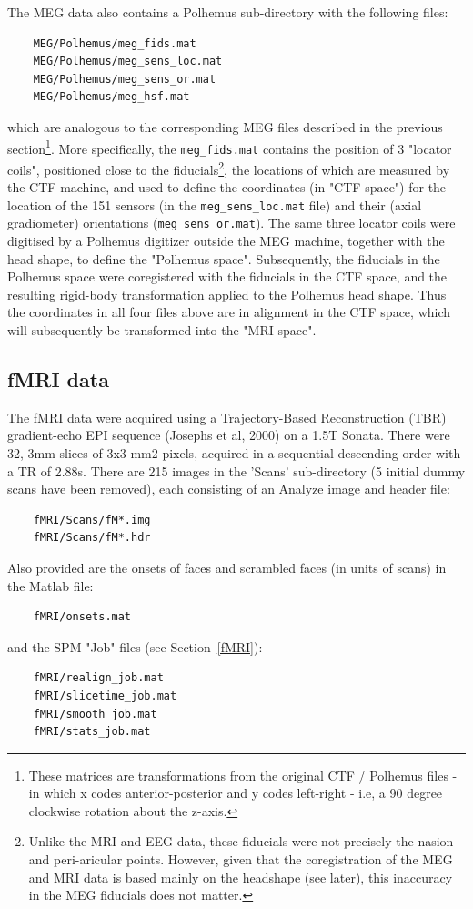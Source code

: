 The MEG data also contains a Polhemus sub-directory with the following files:
\begin{verbatim}
	MEG/Polhemus/meg_fids.mat
	MEG/Polhemus/meg_sens_loc.mat
	MEG/Polhemus/meg_sens_or.mat
	MEG/Polhemus/meg_hsf.mat
\end{verbatim}
which are analogous to the corresponding MEG files described in the previous section\footnote{These matrices are transformations from the original CTF / Polhemus files - in which x codes anterior-posterior and y codes left-right - i.e, a 90 degree clockwise rotation about the z-axis.}. More specifically, the \verb!meg_fids.mat! contains the position of 3 "locator coils", positioned close to the fiducials\footnote{Unlike the MRI and EEG data, these fiducials were not precisely the nasion and peri-aricular points. However, given that the coregistration of the MEG and MRI data is based mainly on the headshape (see later), this inaccuracy in the MEG fiducials does not matter.}, the locations of which are measured by the CTF machine, and used to define the coordinates (in "CTF space") for the location of the 151 sensors (in the \verb!meg_sens_loc.mat! file) and their (axial gradiometer) orientations (\verb!meg_sens_or.mat!). The same three locator coils were digitised by a Polhemus digitizer outside the MEG machine, together with the head shape, to define the "Polhemus space". Subsequently, the fiducials in the Polhemus space were coregistered with the fiducials in the CTF space, and the resulting rigid-body transformation applied to the Polhemus head shape. Thus the coordinates in all four files above are in alignment in the CTF space, which will subsequently be transformed into the "MRI space".

 

\subsection{fMRI data}

The fMRI data were acquired using a Trajectory-Based Reconstruction (TBR) gradient-echo EPI sequence (Josephs et al, 2000) on a 1.5T Sonata. There were 32, 3mm slices of 3x3 mm2 pixels, acquired in a sequential descending order with a TR of 2.88s. There are 215 images in the 'Scans' sub-directory (5 initial dummy scans have been removed), each consisting of an Analyze image and header file:
\begin{verbatim}
	fMRI/Scans/fM*.img	
	fMRI/Scans/fM*.hdr
\end{verbatim}
Also provided are the onsets of faces and scrambled faces (in units of scans) in the Matlab file:
\begin{verbatim}
	fMRI/onsets.mat	
\end{verbatim}
and the SPM "Job" files (see Section~\ref{fMRI}):
\begin{verbatim}
	fMRI/realign_job.mat
	fMRI/slicetime_job.mat
	fMRI/smooth_job.mat
	fMRI/stats_job.mat
\end{verbatim}


